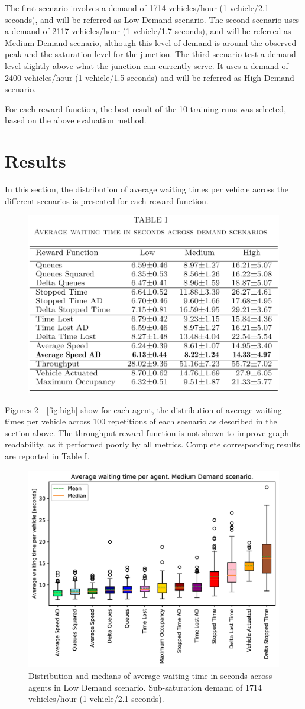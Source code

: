 \documentclass{article}
\begin{document}
The first scenario involves a demand of 1714 vehicles/hour (1 vehicle/2.1 seconds), and will be referred as Low Demand scenario.
The second scenario uses a demand of 2117 vehicles/hour (1 vehicle/1.7 seconds), and will be referred as Medium Demand scenario, although this level of demand is around the observed peak and the saturation level for the junction.
The third scenario test a demand level slightly above what the junction can currently serve. It uses a demand of 2400 vehicles/hour (1 vehicle/1.5 seconds) and will be referred as High Demand scenario.

For each reward function, the best result of the 10 training runs was selected, based on the above evaluation method.

\section{Results}\label{results}
In this section, the distribution of average waiting times per vehicle across the different scenarios is presented for each reward function.

\begin{figure}[thpb]
    \centering
    \includegraphics[width=.5\linewidth]{figures/table.png}
    \label{fig:table}
\end{figure}

Figures \ref{fig:low} - \ref{fig:high} show for each agent, the distribution of average waiting times per vehicle across 100 repetitions of each scenario as described in the section above.
The throughput reward function is not shown to improve graph readability, as it performed poorly by all metrics. 
Complete corresponding results are reported in Table I.
\begin{figure}[thpb]
    \centering
    \includegraphics[width=.7\linewidth]{figures/rand_2_1_ordered_color_DS.jpg}
    \caption{Distribution and medians of average waiting time in seconds across agents in Low Demand scenario. Sub-saturation demand of 1714 vehicles/hour (1 vehicle/2.1 seconds).}
    \label{fig:low}
\end{figure}
\end{document}
